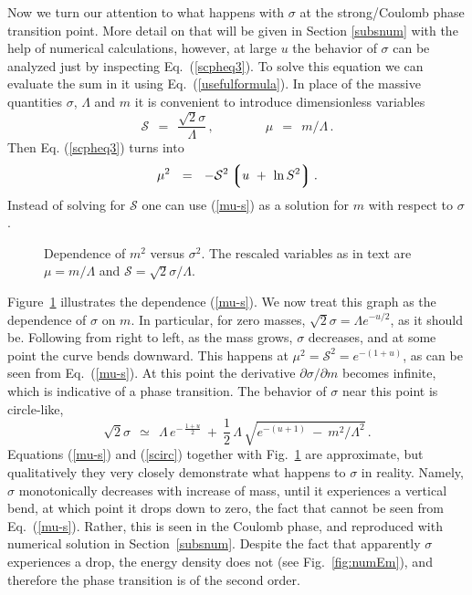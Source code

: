 \documentclass[epsfig,12pt]{article}
\def\beq{\begin{equation}}
\def\eeq{\end{equation}}
\newcommand{\cs}{{\mathcal S}}
\def\beq{\begin{equation}}
\def\eeq{\end{equation}}
\newcommand{\p}{\partial}
\newcommand{\lgr}{\left\lgroup}
\newcommand{\rgr}{\right\rgroup}
\begin{document}
{%

Now we turn our attention to what happens with $\sigma $ at the strong/Coulomb
phase transition point.
More detail on that will be given in Section \ref{subsnum} with the help
of numerical calculations, however, at large $u$ the behavior of $\sigma$ can be analyzed 
just by inspecting Eq.~(\ref{scpheq3}). 
To solve this equation we can evaluate the sum in it using Eq.~(\ref{usefulformula}).
In place of the massive quantities $ \sigma $, $\Lambda $ and $ m $ it is convenient to 
introduce dimensionless variables
\beq
	\cs ~~=~~ \frac{\sqrt{2} \sigma}{\Lambda}\,, \qquad\qquad
        \mu ~~=~~ m/\Lambda\,.
\label{csdef}
\eeq
Then Eq. (\ref{scpheq3}) turns into
\beq
\label{mu-s}
	\mu^2  ~~=~~ - \cs^2 \lgr u  ~+~ \ln S^2 \rgr .
\eeq
Instead of solving for $ \cs $ one can use (\ref{mu-s}) as a solution for $ m $ with respect 
to $ \sigma $.
\begin{figure}
\centerline{}
\caption{\small Dependence of $m^2$ versus $\sigma^2$. The rescaled variables as in text are
$\mu = m/\Lambda$ and $\cs = \sqrt{2}\sigma/\Lambda$. }
\label{fig:mus}
\end{figure}
Figure~\ref{fig:mus} illustrates the dependence (\ref{mu-s}). 
We now treat this graph as the dependence of $ \sigma $ on  $m$.
In particular, for zero masses, $ \sqrt{2}\sigma = \Lambda e^{-u/2} $, as it should be.
Following from right to left, as the mass grows, $ \sigma $ decreases, and at some point 
the curve bends downward. 
This happens at $ \mu^2 = \cs^2 = e^{-(1+u)}$, as can be seen from Eq.~(\ref{mu-s}). 
At this point the derivative $ \p\sigma/\p m $ becomes infinite, which is indicative of a
phase transition. 
The behavior of $ \sigma $ near this point is circle-like,
\beq
\label{scirc}
	\sqrt{2}\sigma ~~\simeq~~ \Lambda\, e^{-\, \frac{1+u}{2}}  ~+~ 
		\frac{1}{2}\,\Lambda\, \sqrt{e^{- (u+1)} ~-~ m^2/\Lambda^2 } \,.
\eeq
Equations (\ref{mu-s}) and  (\ref{scirc}) together with Fig.~\ref{fig:mus} are approximate, but qualitatively
they very closely demonstrate what happens to $ \sigma $ in reality. 
Namely, $ \sigma $ monotonically decreases with increase of mass, 
until it experiences a vertical bend, at which point
it drops down to zero, the fact that cannot be seen from Eq.~(\ref{mu-s}). 
Rather, this is seen in the Coulomb phase, and reproduced with numerical solution in Section~\ref{subsnum}.
Despite the fact that apparently $ \sigma $ experiences a drop, the energy density does not
(see Fig.~\ref{fig:numEm}), and therefore the phase transition is of the second order. 

}
\end{document}
